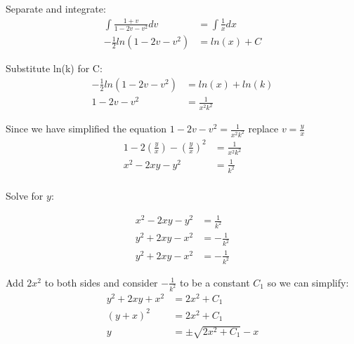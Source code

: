 \documentclass{article}
\begin{document}
\begin{flushleft}
{ Separate and integrate:
\begin{align*}
\int \frac{1+v}{1-2v-v^2}dv & = \int \frac{1}{x}dx\\
-\frac{1}{2} ln(1-2v-v^2) & = ln(x) + C
 \end{align*} 
 
 Substitute ln(k) for C:
 \begin{align*}
-\frac{1}{2} ln(1-2v-v^2) & = ln(x) + ln(k) \\
 1-2v-v^2 & = \frac{1}{x^2k^2 }
 \end{align*}
 
Since we have simplified the equation $1-2v-v^2 =\frac{1}{x^2k^2 } $  replace $v = \frac{y}{x}$
 \begin{align*}
 1-2(\frac{y}{x})-(\frac{y}{x})^2 & = \frac{1}{x^2k^2 }\\
 x^2-2xy-y^2 & = \frac{1}{k^2 }\\
\end{align*}

Solve for $y$:

 \begin{align*}
x^2-2xy-y^2 & = \frac{1}{k^2 }\\
y^2+2xy-x^2 & = -\frac{1}{k^2 }\\
y^2+2xy-x^2 & = -\frac{1}{k^2 }
\end{align*}

Add $2x^2$ to both sides and consider $-\frac{1}{k^2}$ to be a constant $C_1$ so we can simplify:
\begin{align*}
y^2+2xy+x^2 & = 2x^2+C_1\\
(y+x)^2 & = 2x^2+C_1\\
y & = \pm \sqrt{2x^2+C_1} - x
\end{align*}


}


\end{flushleft}
\end{document}
